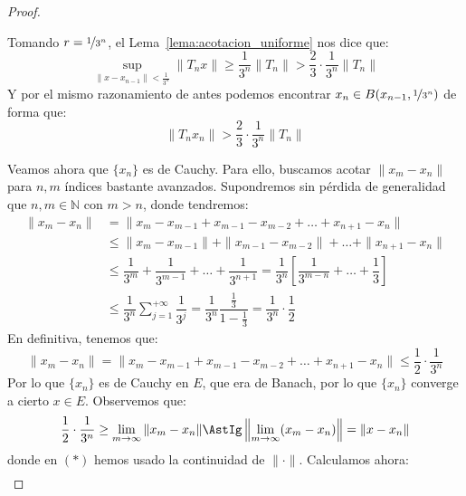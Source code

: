 \begin{teo}
\begin{proof}
\begin{itemize}
                Tomando $r = \nicefrac{1}{3^n}$, el Lema~\ref{lema:acotacion_uniforme} nos dice que:
                \begin{equation*}
                    \sup_{\|x-x_{n-1}\| < \frac{1}{3^n}}\|T_nx\| \geq \dfrac{1}{3^n}\|T_n\| > \dfrac{2}{3}\cdot \dfrac{1}{3^n} \|T_n\|
                \end{equation*}
                Y por el mismo razonamiento de antes podemos encontrar $x_n\in B(x_{n-1},\nicefrac{1}{3^n})$ de forma que:
                \begin{equation*}
                    \|T_nx_n\| > \dfrac{2}{3}\cdot \dfrac{1}{3^n}\|T_n\|
                \end{equation*}
        \end{itemize}
        Veamos ahora que $\{x_n\}$ es de Cauchy. Para ello, buscamos acotar $\|x_m - x_n\|$ para $n,m$ índices bastante avanzados. Supondremos sin pérdida de generalidad que $n,m\in \mathbb{N}$ con $m>n$, donde tendremos:
        \begin{align*}
            \|x_m-x_n\| &= \|x_m - x_{m-1} + x_{m-1} - x_{m-2} + \ldots + x_{n+1} - x_n\| \\
                        &\leq \|x_m - x_{m-1} \| + \| x_{m-1} - x_{m-2} \| + \ldots + \|x_{n+1} - x_n\| \\
                        &\leq \dfrac{1}{3^m} + \dfrac{1}{3^{m-1}} + \ldots + \dfrac{1}{3^{n+1}} = \dfrac{1}{3^n}\left[\dfrac{1}{3^{m-n}} + \ldots + \dfrac{1}{3}\right] \\
                        &\leq \dfrac{1}{3^n} \sum_{j=1}^{+\infty} \dfrac{1}{3^j} = \dfrac{1}{3^n} \dfrac{\frac{1}{3}}{1-\frac{1}{3}} = \dfrac{1}{3^n}\cdot \dfrac{1}{2}
        \end{align*}
        En definitiva, tenemos que:
        \begin{equation*}
            \|x_m-x_n\| = \|x_m - x_{m-1} + x_{m-1} - x_{m-2} + \ldots + x_{n+1} - x_n\| \leq \dfrac{1}{2}\cdot \dfrac{1}{3^n}
        \end{equation*}
        Por lo que $\{x_n\}$ es de Cauchy en $E$, que era de Banach, por lo que $\{x_n\}$ converge a cierto $x\in E$. Observemos que:
        \begin{equation*}
            \dfrac{1}{2}\cdot \dfrac{1}{3^n} \geq \lim_{m\to\infty}\|x_m-x_n\| \AstIg \left\|\lim_{m\to\infty}(x_m-x_n)\right\| = \|x-x_n\|
        \end{equation*}
        donde en $(\ast)$ hemos usado la continuidad de $\|\cdot \|$. Calculamos ahora:
        \begin{align*}

\end{align*}
\end{proof}
\end{teo}

